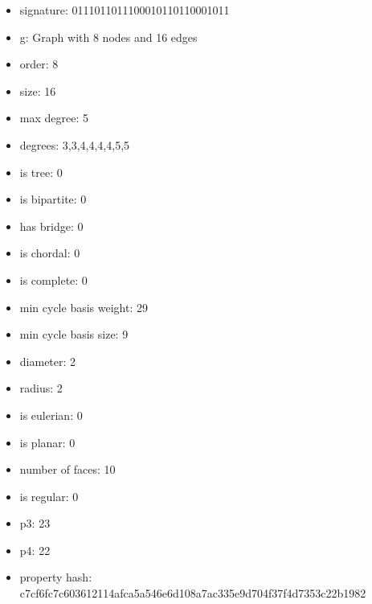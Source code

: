 \begin{itemize}
\item signature: 0111011011100010110110001011
\item g: Graph with 8 nodes and 16 edges
\item order: 8
\item size: 16
\item max degree: 5
\item degrees: 3,3,4,4,4,4,5,5
\item is tree: 0
\item is bipartite: 0
\item has bridge: 0
\item is chordal: 0
\item is complete: 0
\item min cycle basis weight: 29
\item min cycle basis size: 9
\item diameter: 2
\item radius: 2
\item is eulerian: 0
\item is planar: 0
\item number of faces: 10
\item is regular: 0
\item p3: 23
\item p4: 22
\item property hash: c7cf6fc7c603612114afca5a546e6d108a7ac335e9d704f37f4d7353c22b1982
\end{itemize}
\newpage
\begin{figure}
\end{figure}
